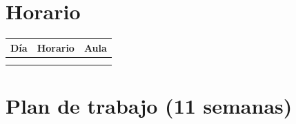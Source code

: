 \documentclass[12pt]{article}
\begin{document}
	\vspace{1em}
	
	\section*{Horario}
	
	\begin{center}
		\renewcommand{\arraystretch}{1.3}
		\begin{tabular}{|c|c|c|}
			\hline
			\textbf{Día} & \textbf{Horario} & \textbf{Aula} \\
			\hline
			\underline{\makebox[2.8cm][c]{Martes}} &
			\underline{\makebox[2.8cm][c]{11--14}} &
			\underline{\makebox[2.8cm][c]{A-608COM}} \\
			\hline
			\underline{\makebox[2.8cm][c]{Viernes}} &
			\underline{\makebox[2.8cm][c]{9--11}} &
			\underline{\makebox[2.8cm][c]{A-428}} \\
			\hline
		\end{tabular}
	\end{center}
	
	
	\vspace{1em}


\section*{Plan de trabajo (11 semanas)}
\end{document}
